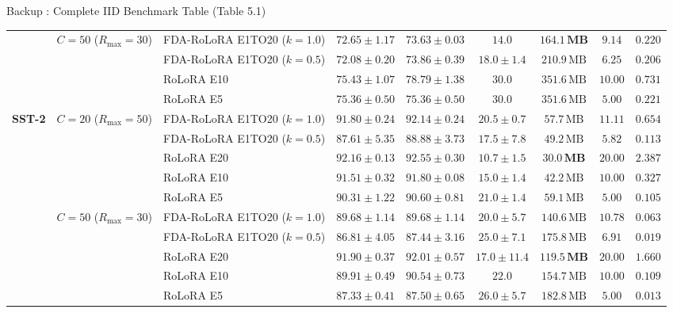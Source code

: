 \documentclass[aspectratio=169]{beamer}
\begin{document}
\begin{frame}[noframenumbering, label=backup_iid_table]{Backup : Complete IID Benchmark Table (Table 5.1)}
{\begin{tabular}{lllcccccc}
        \cmidrule{2-9}
        & \multirow{4}{*}{$C=50$ ($R_{\max}=30$)} 
        & FDA-RoLoRA E1TO20 ($k=1.0$) & $72.65 \pm 1.17$ & $73.63 \pm 0.03$ & $\mathbf{14.0}$ & $\mathbf{164.1\,\text{MB}}$ & $9.14$ & $0.220$ \\
        & & FDA-RoLoRA E1TO20 ($k=0.5$) & $72.08 \pm 0.20$ & $73.86 \pm 0.39$ & $18.0 \pm 1.4$ & $210.9\,\text{MB}$ & $6.25$ & $0.206$ \\
        & & RoLoRA E10 & $\mathbf{75.43 \pm 1.07}$ & $\mathbf{78.79 \pm 1.38}$ & $30.0$ & $351.6\,\text{MB}$ & $10.00$ & $0.731$ \\
        & & RoLoRA E5 & $75.36 \pm 0.50$ & $75.36 \pm 0.50$ & $30.0$ & $351.6\,\text{MB}$ & $5.00$ & $0.221$ \\
        \midrule
        \multirow{10}{*}{\textbf{SST-2}} 
        & \multirow{5}{*}{$C=20$ ($R_{\max}=50$)} 
        & FDA-RoLoRA E1TO20 ($k=1.0$) & $91.80 \pm 0.24$ & $92.14 \pm 0.24$ & $20.5 \pm 0.7$ & $57.7\,\text{MB}$ & $11.11$ & $0.654$ \\
        & & FDA-RoLoRA E1TO20 ($k=0.5$) & $87.61 \pm 5.35$ & $88.88 \pm 3.73$ & $17.5 \pm 7.8$ & $49.2\,\text{MB}$ & $5.82$ & $0.113$ \\
        & & RoLoRA E20 & $\mathbf{92.16 \pm 0.13}$ & $\mathbf{92.55 \pm 0.30}$ & $\mathbf{10.7 \pm 1.5}$ & $\mathbf{30.0\,\text{MB}}$ & $20.00$ & $2.387$ \\
        & & RoLoRA E10 & $91.51 \pm 0.32$ & $91.80 \pm 0.08$ & $15.0 \pm 1.4$ & $42.2\,\text{MB}$ & $10.00$ & $0.327$ \\
        & & RoLoRA E5 & $90.31 \pm 1.22$ & $90.60 \pm 0.81$ & $21.0 \pm 1.4$ & $59.1\,\text{MB}$ & $5.00$ & $0.105$ \\
        \cmidrule{2-9}
        & \multirow{5}{*}{$C=50$ ($R_{\max}=30$)} 
        & FDA-RoLoRA E1TO20 ($k=1.0$) & $89.68 \pm 1.14$ & $89.68 \pm 1.14$ & $20.0 \pm 5.7$ & $140.6\,\text{MB}$ & $10.78$ & $0.063$ \\
        & & FDA-RoLoRA E1TO20 ($k=0.5$) & $86.81 \pm 4.05$ & $87.44 \pm 3.16$ & $25.0 \pm 7.1$ & $175.8\,\text{MB}$ & $6.91$ & $0.019$ \\
        & & RoLoRA E20 & $\mathbf{91.90 \pm 0.37}$ & $\mathbf{92.01 \pm 0.57}$ & $\mathbf{17.0 \pm 11.4}$ & $\mathbf{119.5\,\text{MB}}$ & $20.00$ & $1.660$ \\
        & & RoLoRA E10 & $89.91 \pm 0.49$ & $90.54 \pm 0.73$ & $22.0$ & $154.7\,\text{MB}$ & $10.00$ & $0.109$ \\
        & & RoLoRA E5 & $87.33 \pm 0.41$ & $87.50 \pm 0.65$ & $26.0 \pm 5.7$ & $182.8\,\text{MB}$ & $5.00$ & $0.013$ \\
        \bottomrule
    \end{tabular}%
    }
\end{frame}
\end{document}
